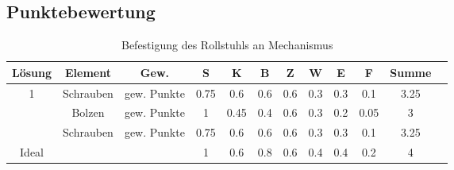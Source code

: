 \documentclass[10pt,a4paper]{article}
\begin{document}
\subsection{Punktebewertung}
\begin{table}[h]
    \centering
    \begin{tabular}{cccccccccccc}
        \toprule
        \textbf{Lösung} & \textbf{Element} & \textbf{Gew.} & \textbf{S} & \textbf{K} & \textbf{B} & \textbf{Z} & \textbf{W} & \textbf{E} & \textbf{F} & \textbf{Summe} & \\
        \midrule
        1               & Schrauben        & gew. Punkte   & 0.75       & 0.6        & 0.6        & 0.6        & 0.3        & 0.3        & 0.1        & 3.25             \\
        \addlinespace
        2               & Bolzen           & gew. Punkte   & 1          & 0.45       & 0.4        & 0.6        & 0.3        & 0.2        & 0.05       & 3                \\
        \addlinespace
        3               & Schrauben        & gew. Punkte   & 0.75       & 0.6        & 0.6        & 0.6        & 0.3        & 0.3        & 0.1        & 3.25             \\
        \midrule
        Ideal           &                  &               & 1          & 0.6        & 0.8        & 0.6        & 0.4        & 0.4        & 0.2        & 4                \\
        \bottomrule
    \end{tabular}
    \caption{Befestigung des Rollstuhls an Mechanismus}
    \label{tab:befestigung}
\end{table}
\end{document}
